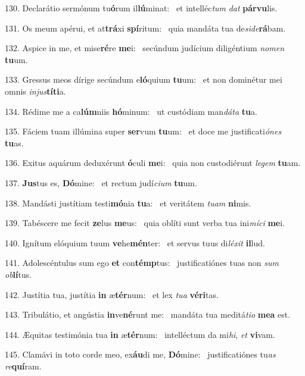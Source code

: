 130. Declarátio sermónum tu\textbf{ó}rum il\textbf{lú}minat: \ast\  et intelléc\textit{tum} \textit{dat} \textbf{pár}\textbf{vu}lis.\

131. Os meum apérui, et at\textbf{trá}xi \textbf{spí}ritum: \ast\  quia mandáta tua de\textit{si}\textit{de}\textbf{rá}bam.\

132. Aspice in me, et mise\textbf{ré}re \textbf{me}i: \ast\  secúndum judícium diligéntium \textit{no}\textit{men} \textbf{tu}um.\

133. Gressus meos dírige secúndum e\textbf{ló}quium \textbf{tu}um: \ast\  et non dominétur mei omnis \textit{in}\textit{jus}\textbf{tí}\textbf{ti}a.\

134. Rédime me a ca\textbf{lúm}niis \textbf{hó}minum: \ast\  ut custódiam man\textit{dá}\textit{ta} \textbf{tu}a.\

135. Fáciem tuam illúmina super \textbf{ser}vum \textbf{tu}um: \ast\  et doce me justificati\textit{ó}\textit{nes} \textbf{tu}as.\

136. Exitus aquárum deduxérunt \textbf{ó}culi \textbf{me}i: \ast\  quia non custodiérunt \textit{le}\textit{gem} \textbf{tu}am.\

137. \textbf{Jus}tus es, \textbf{Dó}mine: \ast\  et rectum judí\textit{ci}\textit{um} \textbf{tu}um.\

138. Mandásti justítiam testi\textbf{mó}nia \textbf{tu}a: \ast\  et veritátem \textit{tu}\textit{am} \textbf{ni}mis.\

139. Tabéscere me fecit \textbf{ze}lus \textbf{me}us: \ast\  quia oblíti sunt verba tua ini\textit{mí}\textit{ci} \textbf{me}i.\

140. Ignítum elóquium tuum \textbf{ve}he\textbf{mén}ter: \ast\  et servus tuus di\textit{lé}\textit{xit} \textbf{il}lud.\

141. Adolescéntulus sum ego \textbf{et} con\textbf{témp}tus: \ast\  justificatiónes tuas non \textit{sum} \textit{ob}\textbf{lí}tus.\

142. Justítia tua, justítia \textbf{in} æ\textbf{tér}num: \ast\  et lex \textit{tu}\textit{a} \textbf{vé}\textbf{ri}tas.\

143. Tribulátio, et angústia \textbf{in}ve\textbf{né}runt me: \ast\  mandáta tua meditá\textit{ti}\textit{o} \textbf{me}\textbf{a} est.\

144. Æquitas testimónia tua \textbf{in} æ\textbf{tér}num: \ast\  intelléctum da mi\textit{hi}, \textit{et} \textbf{vi}vam.\

145. Clamávi in toto corde meo, ex\textbf{áu}di me, \textbf{Dó}mine: \ast\  justificatiónes tu\textit{as} \textit{re}\textbf{quí}ram.\

